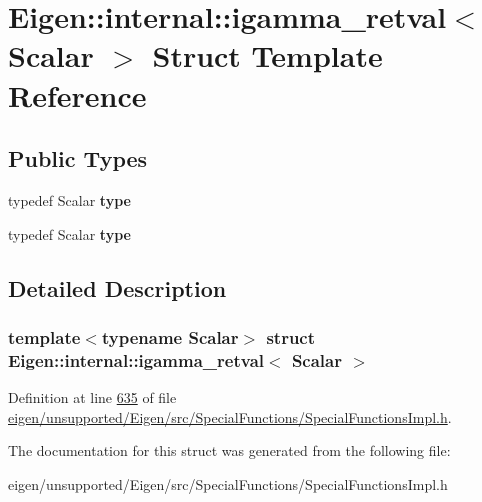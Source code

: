 \hypertarget{struct_eigen_1_1internal_1_1igamma__retval}{}\section{Eigen\+:\+:internal\+:\+:igamma\+\_\+retval$<$ Scalar $>$ Struct Template Reference}
\label{struct_eigen_1_1internal_1_1igamma__retval}
\subsection*{Public Types}
\begin{DoxyCompactItemize}
\item 
\mbox{\label{struct_eigen_1_1internal_1_1igamma__retval_a40b74a4b0cfe20878ba8a131c10d4e05}} 
typedef Scalar {\bfseries type}
\item 
\mbox{\label{struct_eigen_1_1internal_1_1igamma__retval_a40b74a4b0cfe20878ba8a131c10d4e05}} 
typedef Scalar {\bfseries type}
\end{DoxyCompactItemize}


\subsection{Detailed Description}
\subsubsection*{template$<$typename Scalar$>$\newline
struct Eigen\+::internal\+::igamma\+\_\+retval$<$ Scalar $>$}



Definition at line \hyperlink{eigen_2unsupported_2_eigen_2src_2_special_functions_2_special_functions_impl_8h_source_l00635}{635} of file \hyperlink{eigen_2unsupported_2_eigen_2src_2_special_functions_2_special_functions_impl_8h_source}{eigen/unsupported/\+Eigen/src/\+Special\+Functions/\+Special\+Functions\+Impl.\+h}.



The documentation for this struct was generated from the following file\+:\begin{DoxyCompactItemize}
\item 
eigen/unsupported/\+Eigen/src/\+Special\+Functions/\+Special\+Functions\+Impl.\+h\end{DoxyCompactItemize}
